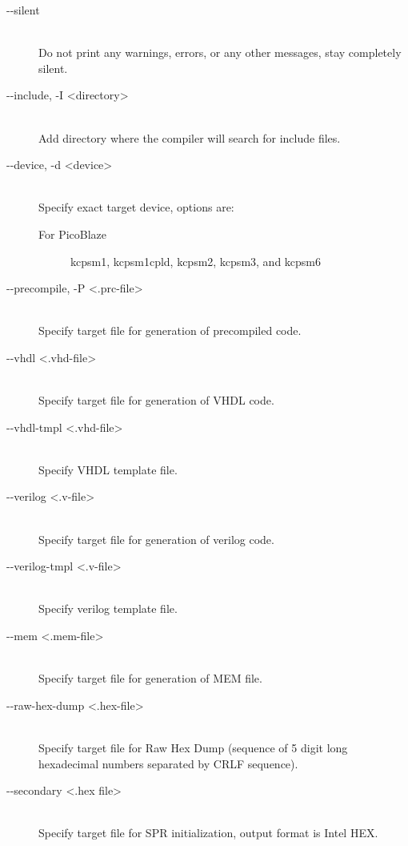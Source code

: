 \begin{description}
            \item[-{}-silent]~\\
                Do not print any warnings, errors, or any other messages, stay completely silent.

            \item[-{}-include, -I <directory>]~\\
                Add directory where the compiler will search for include files.

            \item[-{}-device, -d <device>]~\\
                Specify exact target device, options are:
                \begin{description}
                    \item[For PicoBlaze]
                        kcpsm1, kcpsm1cpld, kcpsm2, kcpsm3, and kcpsm6
                \end{description}

            \item[-{}-precompile, -P <.prc-file>]~\\
                Specify target file for generation of precompiled code.

            \item[-{}-vhdl <.vhd-file>]~\\
                Specify target file for generation of VHDL code.

            \item[-{}-vhdl-tmpl <.vhd-file>]~\\
                Specify VHDL template file.

            \item[-{}-verilog <.v-file>]~\\
                Specify target file for generation of verilog code.

            \item[-{}-verilog-tmpl <.v-file>]~\\
                Specify verilog template file.

            \item[-{}-mem <.mem-file>]~\\
                Specify target file for generation of MEM file.

            \item[-{}-raw-hex-dump <.hex-file>]~\\
                Specify target file for Raw Hex Dump (sequence of 5 digit long hexadecimal numbers separated by CRLF sequence).

            \item[-{}-secondary <.hex file>]~\\
                Specify target file for SPR initialization, output format is Intel HEX.
        \end{description}

